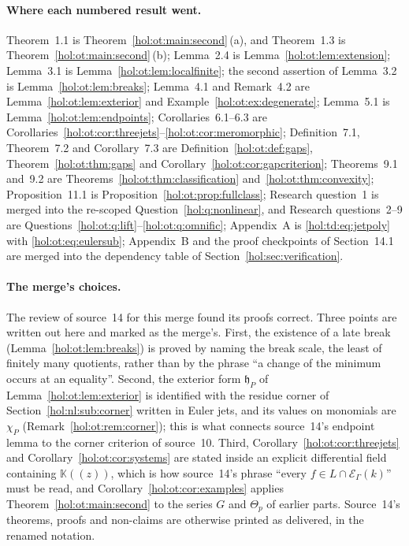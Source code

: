 \documentclass[11pt]{article}
\numberwithin{equation}{section}
\theoremstyle{definition}
\theoremstyle{remark}
\newcommand{\KK}{\mathbb K}
\begin{document}
\paragraph{Where each numbered result went.}
Theorem~1.1 is Theorem~\ref{hol:ot:main:second}\,(a), and Theorem~1.3 is
Theorem~\ref{hol:ot:main:second}\,(b); Lemma~2.4 is
Lemma~\ref{hol:ot:lem:extension}; Lemma~3.1 is
Lemma~\ref{hol:ot:lem:localfinite}; the second assertion of Lemma~3.2 is
Lemma~\ref{hol:ot:lem:breaks}; Lemma~4.1 and Remark~4.2 are
Lemma~\ref{hol:ot:lem:exterior} and Example~\ref{hol:ot:ex:degenerate};
Lemma~5.1 is Lemma~\ref{hol:ot:lem:endpoints};
Corollaries~6.1--6.3 are
Corollaries~\ref{hol:ot:cor:threejets}--\ref{hol:ot:cor:meromorphic};
Definition~7.1, Theorem~7.2 and Corollary~7.3 are
Definition~\ref{hol:ot:def:gaps}, Theorem~\ref{hol:ot:thm:gaps} and
Corollary~\ref{hol:ot:cor:gapcriterion}; Theorems~9.1 and~9.2 are
Theorems~\ref{hol:ot:thm:classification} and~\ref{hol:ot:thm:convexity};
Proposition~11.1 is Proposition~\ref{hol:ot:prop:fullclass}; Research
question~1 is merged into the re-scoped Question~\ref{hol:q:nonlinear}, and
Research questions~2--9 are
Questions~\ref{hol:ot:q:lift}--\ref{hol:ot:q:omnific}; Appendix~A is
\eqref{hol:td:eq:jetpoly} with \eqref{hol:ot:eq:eulersub}; Appendix~B and the
proof checkpoints of Section~14.1 are merged into the dependency table of
Section~\ref{hol:sec:verification}.

\paragraph{The merge's choices.}
The review of source~14 for this merge found its proofs correct. Three points
are written out here and marked as the merge's. First, the existence of a
late break (Lemma~\ref{hol:ot:lem:breaks}) is proved by naming the break
scale, the least of finitely many quotients, rather than by the phrase ``a
change of the minimum occurs at an equality''. Second, the exterior form
$\mathfrak h_P$ of Lemma~\ref{hol:ot:lem:exterior} is identified with the
residue corner of Section~\ref{hol:nl:sub:corner} written in Euler jets, and
its values on monomials are $\chi_P$
(Remark~\ref{hol:ot:rem:corner}); this is what connects source~14's endpoint
lemma to the corner criterion of source~10. Third, Corollary~\ref{hol:ot:cor:threejets}
and Corollary~\ref{hol:ot:cor:systems} are stated inside an explicit
differential field containing $\KK((z))$, which is how source~14's phrase
``every $f\in L\cap\mathcal E_\Gamma(k)$'' must be read, and
Corollary~\ref{hol:ot:cor:examples} applies Theorem~\ref{hol:ot:main:second}
to the series $G$ and $\Theta_p$ of earlier parts. Source~14's theorems,
proofs and non-claims are otherwise printed as delivered, in the renamed
notation.
\end{document}
